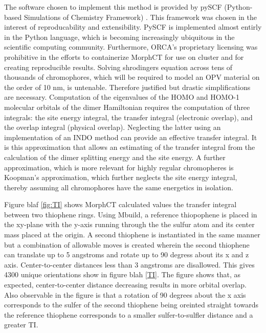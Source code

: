 \indent The software chosen to implement this method is
provided by pySCF (Python-based Simulations of Chemistry Framework) \cite{Sun2018a}. This framework
was chosen in the interest of reproducability and extensibility. PySCF is implemented almost entirly in the Python 
language, which is becoming increasingly ubiquitous in the scientific computing community. Furthermore,
ORCA's proprietary licensing was prohibitive in the efforts to containerize MorphCT for use on cluster and for
creating reproducible results. 
Solving shrodingers equation across tens of thousands of 
chromophores, which will be required to model an OPV material on the order of 10 nm, is untenable. Therefore
justified but drastic simplifications are necessary. Computation of the eigenvalues of the HOMO and HOMO-1
molecular orbitals of the dimer Hamiltonian requires the computation of three integrals: 
the site energy integral, the transfer integral (electronic overlap), and the overlap integral (physical
overlap). Neglecting the latter using an implementation of an INDO method can provide an effective transfer
integral. It is this approximation that allows an estimating of the transfer integral from the calculation of
the dimer splitting energy and the site energy. A further approximation, which is more relevant for highly regular chromopheres is Koopman's
approximation, which further neglects the site energy integral, thereby assuming all chromophores have the same
energetics in isolation.  \cite{Huang2005b}
\newline \indent

Figure blaf \ref{fig:TI} shows MorphCT calculated values the transfer integral between two thiophene
rings. Using Mbuild, a reference thiopophene is placed in the xy-plane with the y-axis running through the 
the sulfur atom and its center mass placed at the origin. A second thiophene is instantiated in the same manner but a
combination of allowable moves is created wherein the second thiophene can translate up to 5 angstroms 
and rotate up to 90 degress about its x and z axis. Center-to-center distances less than 3 angstroms are disallowed. 
This gives 4300 unique orientations show in figure blah \ref{TI}. The figure shows that, as expected,
center-to-center distance decreasing results in more orbital overlap. Also observable in the figure is that
a rotation of 90 degrees about the x axis corresponds to the sulfer of the second thiophene being oreinted
straight towards the reference thiophene corresponds to a smaller sulfer-to-sulfler distance and a greater TI. 


